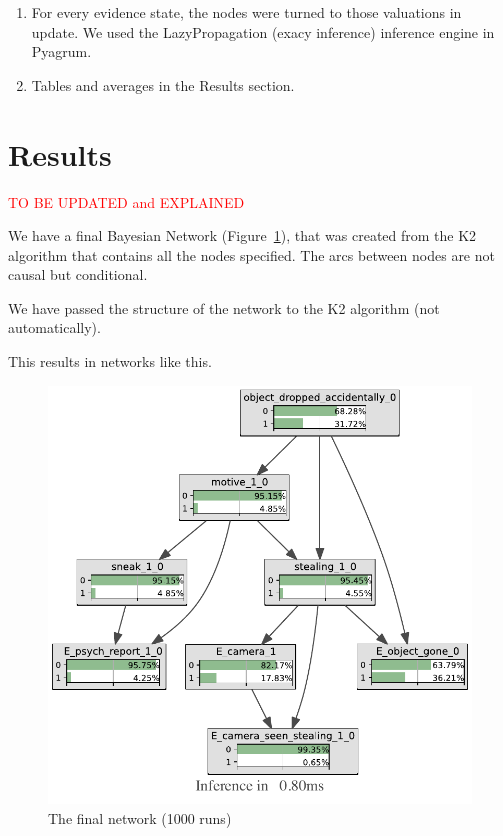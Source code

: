 \documentclass[12pt]{article}
\begin{document}
\begin{enumerate}
\item For every evidence state, the nodes were turned to those valuations in update. We used the LazyPropagation (exacy inference) inference engine in Pyagrum.

\item Tables and averages in the Results section.

\end{enumerate}



\section{Results}


 \textcolor{red} {TO BE UPDATED and EXPLAINED}

We have a final Bayesian Network (Figure~\ref{bullet}), that was created from the K2 algorithm that contains all the nodes specified. The arcs between nodes are not causal but conditional. 

We have passed the structure of the network to the K2 algorithm (not automatically). 

 This results in networks like this.
 
\begin{figure}[htbp]
\begin{center}
\includegraphics[width=\linewidth]{GroteMarktPrivate/bnImage/BNIMAGEGroteMarktPrivate1000.pdf}
\caption{The final network (1000 runs)}
\label{bullet}
\end{center}
\end{figure}
\end{document}
